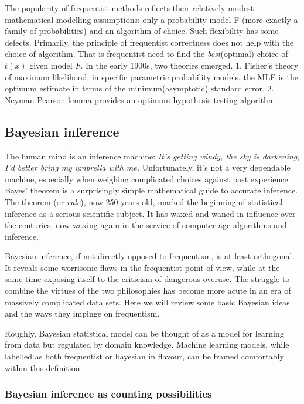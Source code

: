 \documentclass{article}
\begin{document}
The popularity of frequentist methods reflects their relatively modest
mathematical modelling assumptions: only a probability model F (more
exactly a family of probabilities) and an algorithm of choice. Such
flexibility has some defects. Primarily, the principle of frequentist
correctness does not help with the choice of algorithm. That is
frequentist need to find the \emph{best}(optimal) choice of \(t(x)\)
given model \(F\). In the early 1900s, two theories emerged. 1. Fisher's
theory of maximum likelihood: in specific parametric probability models,
the MLE is the optimum estimate in terms of the minimum(asymptotic)
standard error. 2. Neyman-Pearson lemma provides an optimum
hypothesis-testing algorithm.

\hypertarget{bayesian-inference}{%
\subsection{Bayesian inference}\label{bayesian-inference}}

The human mind is an inference machine: \emph{It's getting windy, the
sky is darkening, I'd better bring my umbrella with me.} Unfortunately,
it's not a very dependable machine, especially when weighing complicated
choices against past experience. Bayes' theorem is a surprisingly simple
mathematical guide to accurate inference. The theorem (or \emph{rule}),
now 250 years old, marked the beginning of statistical inference as a
serious scientific subject. It has waxed and waned in influence over the
centuries, now waxing again in the service of computer-age algorithms
and inference.

Bayesian inference, if not directly opposed to frequentism, is at least
orthogonal. It reveals some worrisome flaws in the frequentist point of
view, while at the same time exposing itself to the criticism of
dangerous overuse. The struggle to combine the virtues of the two
philosophies has become more acute in an era of massively complicated
data sets. Here we will review some basic Bayesian ideas and the ways
they impinge on frequentism.

Roughly, Bayesian statistical model can be thought of as a model for
learning from data but regulated by domain knowledge. Machine learning
models, while labelled as both frequentist or bayesian in flavour, can
be framed comfortably within this definition.

\hypertarget{bayesian-inference-as-counting-possibilities}{%
\subsubsection{Bayesian inference as counting
possibilities}\label{bayesian-inference-as-counting-possibilities}}
\end{document}

